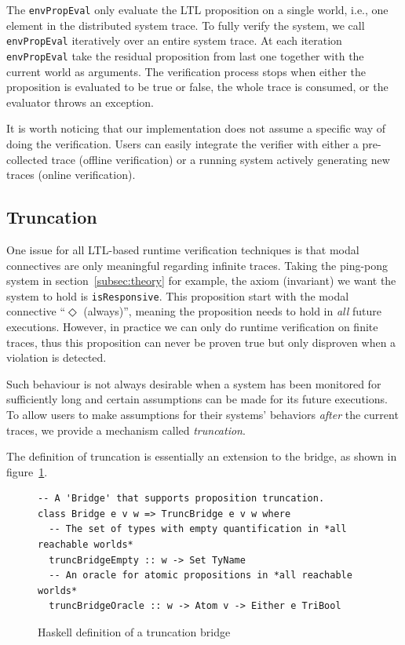 \documentclass[format=acmsmall, nonacm=true, review=true, screen=true]{acmart}
\newcommand{\mycaption}[1]{\Description{#1}\caption{#1}}
\begin{document}
The \texttt{envPropEval} only evaluate the LTL proposition on a single world, i.e., one element in the distributed system trace.
To fully verify the system, we call \texttt{envPropEval} iteratively over an entire system trace.
At each iteration \texttt{envPropEval} take the residual proposition from last one together with the current world as arguments.
The verification process stops when either the proposition is evaluated to be true or false, the whole trace is consumed, or the evaluator throws an exception.

It is worth noticing that our implementation does not assume a specific way of doing the verification.
Users can easily integrate the verifier with either a pre-collected trace (offline verification) or a running system actively generating new traces (online verification).

\subsection{Truncation}

One issue for all LTL-based runtime verification techniques is that modal connectives are only meaningful regarding infinite traces.
Taking the ping-pong system in section~\ref{subsec:theory} for example, the axiom (invariant) we want the system to hold is \texttt{isResponsive}.
This proposition start with the modal connective ``$\Diamond$ (always)'', meaning the proposition needs to hold in \textit{all} future executions.
However, in practice we can only do runtime verification on finite traces, thus this proposition can never be proven true but only disproven when a violation is detected.

Such behaviour is not always desirable when a system has been monitored for sufficiently long and certain assumptions can be made for its future executions.
To allow users to make assumptions for their systems' behaviors \textit{after} the current traces, we provide a mechanism called \textit{truncation}.

The definition of truncation is essentially an extension to the bridge, as shown in figure~\ref{fig:truncation-sig}.

\begin{figure}[h]
  {
    \fontsize{10}{12}\selectfont
    \begin{verbatim}
-- A 'Bridge' that supports proposition truncation.
class Bridge e v w => TruncBridge e v w where
  -- The set of types with empty quantification in *all reachable worlds*
  truncBridgeEmpty :: w -> Set TyName
  -- An oracle for atomic propositions in *all reachable worlds*
  truncBridgeOracle :: w -> Atom v -> Either e TriBool
\end{verbatim}
  }
  \mycaption{Haskell definition of a truncation bridge}
  \label{fig:truncation-sig}
\end{figure}
\end{document}
